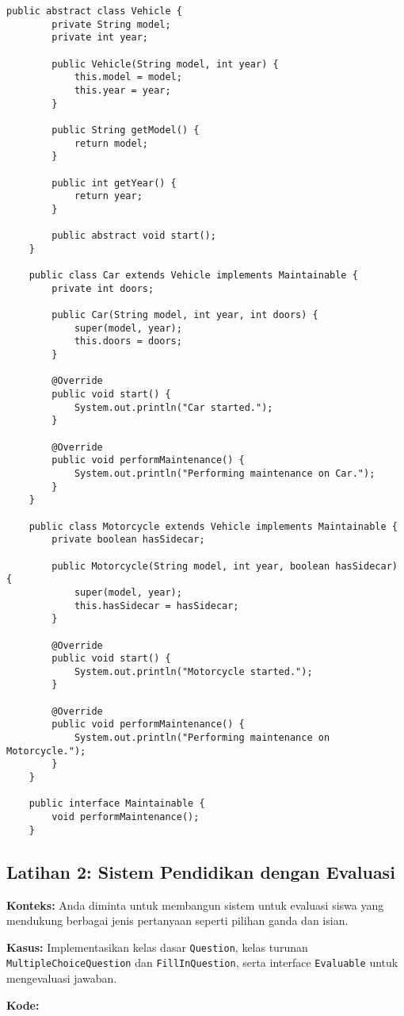 \begin{lstlisting}[style=JavaStyle]
	public abstract class Vehicle {
		private String model;
		private int year;
		
		public Vehicle(String model, int year) {
			this.model = model;
			this.year = year;
		}
		
		public String getModel() {
			return model;
		}
		
		public int getYear() {
			return year;
		}
		
		public abstract void start();
	}
	
	public class Car extends Vehicle implements Maintainable {
		private int doors;
		
		public Car(String model, int year, int doors) {
			super(model, year);
			this.doors = doors;
		}
		
		@Override
		public void start() {
			System.out.println("Car started.");
		}
		
		@Override
		public void performMaintenance() {
			System.out.println("Performing maintenance on Car.");
		}
	}
	
	public class Motorcycle extends Vehicle implements Maintainable {
		private boolean hasSidecar;
		
		public Motorcycle(String model, int year, boolean hasSidecar) {
			super(model, year);
			this.hasSidecar = hasSidecar;
		}
		
		@Override
		public void start() {
			System.out.println("Motorcycle started.");
		}
		
		@Override
		public void performMaintenance() {
			System.out.println("Performing maintenance on Motorcycle.");
		}
	}
	
	public interface Maintainable {
		void performMaintenance();
	}
\end{lstlisting}

\subsection{Latihan 2: Sistem Pendidikan dengan Evaluasi}

\textbf{Konteks:} Anda diminta untuk membangun sistem untuk evaluasi siswa yang mendukung berbagai jenis pertanyaan seperti pilihan ganda dan isian.

\textbf{Kasus:} Implementasikan kelas dasar \texttt{Question}, kelas turunan \texttt{MultipleChoiceQuestion} dan \texttt{FillInQuestion}, serta interface \texttt{Evaluable} untuk mengevaluasi jawaban.

\textbf{Kode:}

